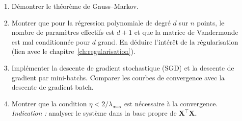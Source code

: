 \begin{exercice}
\begin{enumerate}
  \item D\'emontrer le th\'eor\`eme de Gauss--Markov.
  \item Montrer que pour la r\'egression polynomiale de degr\'e $d$ sur $n$ points,
        le nombre de param\`etres effectifs est $d + 1$ et que la matrice de Vandermonde
        est mal conditionn\'ee pour $d$ grand. En d\'eduire l'int\'er\^et de la
        r\'egularisation (lien avec le chapitre~\ref{ch:regularisation}).
  \item Impl\'ementer la descente de gradient stochastique (SGD) et la descente de
        gradient par mini-batchs. Comparer les courbes de convergence avec la descente
        de gradient batch.
  \item Montrer que la condition $\eta < 2/\lambda_{\max}$ est n\'ecessaire \`a la
        convergence. \emph{Indication :} analyser le syst\`eme dans la base propre de
        $\bm{X}^\top \bm{X}$.
\end{enumerate}
\end{exercice}
